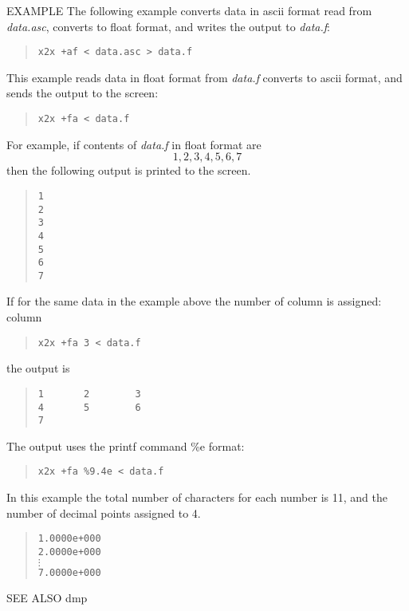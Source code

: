 \begin{qsection}{EXAMPLE}
The following example converts data in ascii format
read from {\em data.asc}, converts to float format,
and writes the output to {\em data.f}:
\begin{quote}
  \verb!x2x +af < data.asc > data.f!
\end{quote}
\par
This example reads data in float format from {\em data.f}
converts to ascii format, and sends the output to the screen:
\begin{quote}
  \verb!x2x +fa < data.f!
\end{quote}
For example, if contents of {\em data.f} in float format are
\begin{displaymath}
  1, 2, 3, 4, 5, 6, 7
\end{displaymath}
then the following output is printed to the screen.
\begin{quote}
  \verb!1! \\
  \verb!2! \\
  \verb!3! \\
  \verb!4! \\
  \verb!5! \\
  \verb!6! \\
  \verb!7!
\end{quote}
\par
If for the same data in the example above
the number of column is assigned:
column
\begin{quote}
  \verb!x2x +fa 3 < data.f!
\end{quote}
the output is
\begin{quote}
  \verb!1       2        3! \\
  \verb!4       5        6! \\
  \verb!7!
\end{quote}
\par
The output uses the printf command \%e format:
\begin{quote}
  \verb!x2x +fa %9.4e < data.f!
\end{quote}
In this example the total number of characters for each number
is 11, and the number of decimal points assigned to 4.
\begin{quote}
  \verb!1.0000e+000! \\
  \verb!2.0000e+000! \\
  \mbox{\hspace{2em}}$\vdots$ \\
  \verb!7.0000e+000!
\end{quote}
\end{qsection}

\begin{qsection}{SEE ALSO}
dmp
\end{qsection}
